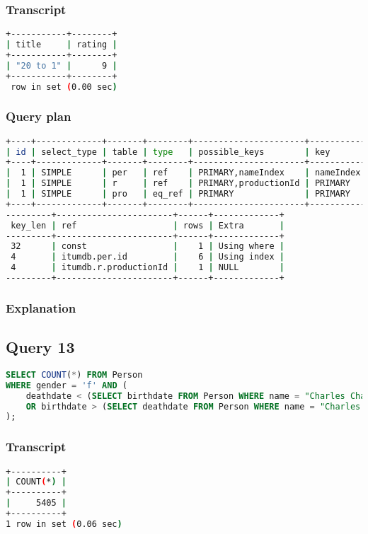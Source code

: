 \subsubsection{Transcript}
\begin{lstlisting}[language=bash]
+-----------+--------+
| title     | rating |
+-----------+--------+
| "20 to 1" |      9 |
+-----------+--------+
 row in set (0.00 sec)
\end{lstlisting}

\subsubsection{Query plan}
\begin{lstlisting}[language=bash]
+----+-------------+-------+--------+----------------------+-----------+
| id | select_type | table | type   | possible_keys        | key       |
+----+-------------+-------+--------+----------------------+-----------+
|  1 | SIMPLE      | per   | ref    | PRIMARY,nameIndex    | nameIndex |
|  1 | SIMPLE      | r     | ref    | PRIMARY,productionId | PRIMARY   |
|  1 | SIMPLE      | pro   | eq_ref | PRIMARY              | PRIMARY   |
+----+-------------+-------+--------+----------------------+-----------+
---------+-----------------------+------+-------------+
 key_len | ref                   | rows | Extra       |
---------+-----------------------+------+-------------+
 32      | const                 |    1 | Using where |
 4       | itumdb.per.id         |    6 | Using index |
 4       | itumdb.r.productionId |    1 | NULL        |
---------+-----------------------+------+-------------+
\end{lstlisting}

\subsubsection{Explanation}


\subsection{Query 13}
\begin{lstlisting}[language=sql]
SELECT COUNT(*) FROM Person
WHERE gender = 'f' AND (
	deathdate < (SELECT birthdate FROM Person WHERE name = "Charles Chaplin")
	OR birthdate > (SELECT deathdate FROM Person WHERE name = "Charles Chaplin")
);
\end{lstlisting}

\subsubsection{Transcript}
\begin{lstlisting}[language=bash]
+----------+
| COUNT(*) |
+----------+
|     5405 |
+----------+
1 row in set (0.06 sec)
\end{lstlisting}

